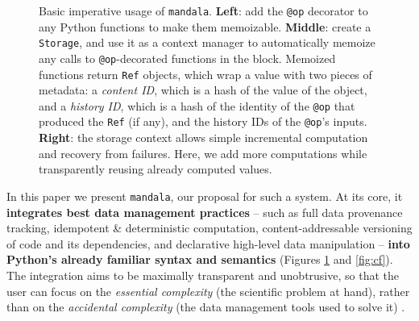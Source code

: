 \documentclass{article} %
\begin{document}
\begin{figure}[h]
\begin{subfigure}{0.4\textwidth}
\end{subfigure}
\caption{Basic imperative usage of \texttt{mandala}. \textbf{Left}: add the \texttt{@op}
decorator to any Python functions to make them memoizable. \textbf{Middle}:
create a \texttt{Storage}, and use it as a context manager to automatically
memoize any calls to \texttt{@op}-decorated functions in the block. Memoized
functions return \texttt{Ref} objects, which wrap a value with two pieces of
metadata: a \emph{content ID}, which is a hash of the value of the
object, and a \emph{history ID}, which is a hash of the identity of the
\texttt{@op} that produced the \texttt{Ref} (if any), and the history IDs of the
\texttt{@op}'s inputs. \textbf{Right}: the storage context allows simple
incremental computation and recovery from failures. Here, we add more
computations while transparently reusing already computed values.}
\label{fig:basic-usage}
\end{figure}

In this paper we present \texttt{mandala}, our proposal for such a system. At
its core, it \textbf{integrates best data management practices} -- such as full
data provenance tracking, idempotent \& deterministic computation,
content-addressable versioning of code and its dependencies, and declarative
high-level data manipulation -- \textbf{into Python's already familiar syntax
and semantics} (Figures \ref{fig:basic-usage} and \ref{fig:cf}). The integration aims to be
maximally transparent and unobtrusive, so that the user can focus on the
\emph{essential complexity} (the scientific problem at hand), rather than on the
\emph{accidental complexity} (the data management tools used to solve it)
\citep{Brooks1987NoSB}.
\end{document}
